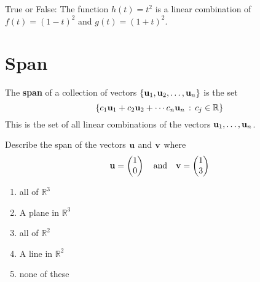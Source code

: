 \begin{problem}
    True or False: The function $h(t) = t^2$ is a linear combination of $f(t) = (1-t)^2$
    and $g(t) = (1+t)^2$.
\end{problem}
% 
%             


\section{Span}

\begin{definition}
    The {\bf span} of a collection of vectors $\{{\bf u}_1,{\bf u}_2,\ldots,{\bf u}_n\}$ is the set \[
    \{ c_1 {\bf u}_1 + c_2 {\bf u}_2 + \cdots c_n {\bf u}_n \, : \, c_j \in \mathbb{R} \} \] This is
    the set of all linear combinations of the vectors ${\bf u}_1, \ldots, {\bf u}_n$.
\end{definition}

\begin{problem}
    Describe the span of the vectors ${\bf u}$ and ${\bf v}$ where
    \[ {\bf u} = \begin{pmatrix} 1 \\ 0 \end{pmatrix} \quad \text{and} \quad {\bf v} =
    \begin{pmatrix} 1 \\ 3 \end{pmatrix} \]
    \begin{enumerate}
        \item all of $\mathbb{R}^3$
        \item A plane in $\mathbb{R}^3$
        \item all of $\mathbb{R}^2$
        \item A line in $\mathbb{R}^2$
        \item none of these
    \end{enumerate}
\end{problem}

